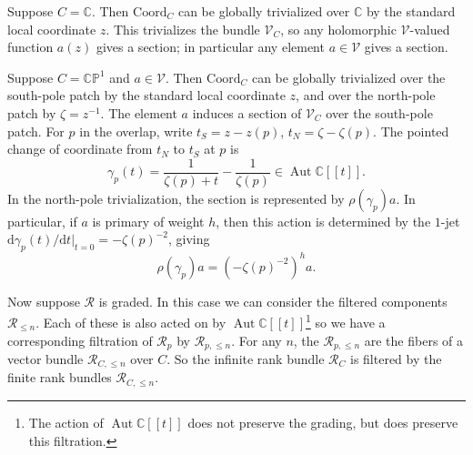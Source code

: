 \documentclass[12pt,letterpaper,reqno]{amsart}
\numberwithin{equation}{section}
\newcommand{\Autdisc}{\ensuremath{\Aut \bbC[[t]]}}
\newcommand{\Coord}{\ensuremath{\mathrm{Coord}}}
\newcommand{\bbC}{\ensuremath{\mathbb C}}
\newcommand{\bbP}{\ensuremath{\mathbb P}}
\newcommand{\de}{\mathrm{d}}
\newcommand{\vertex}{\mathcal{V}}
\newcommand{\vrep}{\mathcal{R}}
\DeclareMathOperator{\Aut}{Aut}
\begin{document}
\begin{example}
Suppose $C = \bbC$. 
Then $\Coord_C$ can be globally trivialized over $\bbC$ by the standard local coordinate $z$.
This trivializes the bundle $\vertex_C$, so any holomorphic $\vertex$-valued function 
$a(z)$ gives a section; in particular any element $a \in \vertex$ gives a section.
\end{example}

\begin{example}
Suppose $C = \bbC \bbP^1$ and $a \in \vertex$. 
Then $\Coord_C$ can be globally trivialized over the south-pole patch by the standard local coordinate $z$,
and over the north-pole patch by $\zeta = z^{-1}$.
The element $a$ induces a section of $\vertex_C$ over the south-pole patch.
For $p$ in the overlap, write
$t_S = z-z(p)$,
$t_N = \zeta-\zeta(p)$.
The pointed change of coordinate from $t_N$ to $t_S$ at $p$ is
$$
\gamma_p(t)
=
\frac{1}{\zeta(p)+t}-\frac{1}{\zeta(p)}
\in \Autdisc .
$$
In the north-pole trivialization, the section is represented by $\rho(\gamma_p) a$.
In particular, if $a$ is primary of weight $h$, then this action is determined by
the $1$-jet $\de \gamma_p(t) / \de t \vert_{t=0} = - \zeta(p)^{-2}$, giving
$$
\rho(\gamma_p)a
=
\left(-\zeta(p)^{-2}\right)^h a.
$$
\end{example}

Now suppose $\vrep$ is graded.
In this case we can consider the filtered components
$\vrep_{\le n}$. Each of these is also acted on by $\Autdisc$\footnote{The action of $\Autdisc$ does not preserve the grading, but does preserve this filtration.}
so we have a corresponding filtration of $\vrep_p$ by
$\vrep_{p, \le n}$.
For any $n$, the $\vrep_{p, \le n}$
are the fibers of a vector bundle $\vrep_{C, \le n}$ over $C$.
So the infinite rank bundle $\vrep_C$ is filtered
by the finite rank bundles $\vrep_{C,\le n}$.


\end{document}
